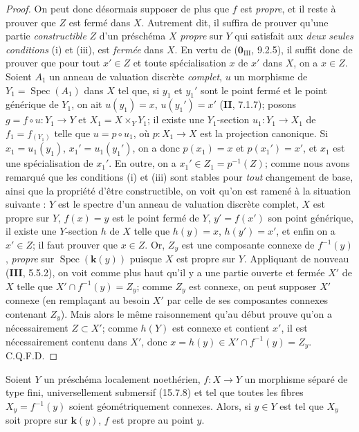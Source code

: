 \begin{proof}
On peut donc désormais supposer de plus que $f$ est \emph{propre}, et il reste à prouver que $Z$ est fermé dans $X$. Autrement dit, il suffira de prouver qu'une partie \emph{constructible} $Z$ d'un préschéma $X$ \emph{propre} sur $Y$ qui satisfait aux \emph{deux seules conditions} (i) et (iii), est \emph{fermée} dans $X$. En vertu de ($\mathbf{0}_{\mathrm{III}}$, 9.2.5), il suffit donc de prouver que pour tout $x'\in Z$ et toute spécialisation $x$ de $x'$ dans $X$, on a $x\in Z$. Soient $A_1$ un anneau de valuation discrète \emph{complet}, $u$ un morphisme de $Y_1=\operatorname{Spec}(A_1)$ dans $X$ tel que, si $y_1$ et $y_1'$ sont le point fermé et le point générique de $Y_1$, on ait $u(y_1)=x$, $u(y_1')=x'$ (\textbf{II}, 7.1.7); posons $g=f\circ u:Y_1\to Y$ et $X_1=X\times_Y Y_1$; il existe une $Y_1$-section $u_1:Y_1\to X_1$ de $f_1=f_{(Y_1)}$ telle que $u=p\circ u_1$, où $p:X_1\to X$ est la projection canonique. Si $x_1=u_1(y_1)$, $x_1'=u_1(y_1')$, on a donc $p(x_1)=x$ et $p(x_1')=x'$, et $x_1$ est une spécialisation de $x_1'$. En outre, on a $x_1'\in Z_1=p^{-1}(Z)$; comme nous avons remarqué que les conditions (i) et (iii) sont stables pour \emph{tout} changement de base, ainsi que la propriété d'être constructible, on voit qu'on est ramené à la situation suivante : $Y$ est le spectre d'un anneau de valuation discrète complet, $X$ est propre sur $Y$, $f(x)=y$ est le point fermé de $Y$, $y'=f(x')$ son point générique, il existe une $Y$-section $h$ de $X$ telle que $h(y)=x$, $h(y')=x'$, et enfin on a $x'\in Z$; il faut prouver que $x\in Z$. Or, $Z_y$ est une composante connexe de $f^{-1}(y)$, \emph{propre} sur $\operatorname{Spec}(\mathbf k(y))$ puisque $X$ est propre sur $Y$. Appliquant de nouveau (\textbf{III}, 5.5.2), on voit comme plus haut qu'il y a une partie ouverte et fermée $X'$ de $X$ telle que $X'\cap f^{-1}(y)=Z_y$; comme $Z_y$ est connexe,
on peut supposer $X'$ connexe (en remplaçant au besoin $X'$ par celle de ses composantes connexes contenant $Z_y$). Mais alors le même raisonnement qu'au début prouve qu'on a nécessairement $Z\subset X'$; comme $h(Y)$ est connexe et contient $x'$, il est nécessairement contenu dans $X'$, donc $x=h(y)\in X'\cap f^{-1}(y)=Z_y$. C.Q.F.D.
\end{proof}

\begin{corollary}[15.7.10]
\label{IV.15.7.10-fr}
Soient $Y$ un préschéma localement noethérien, $f:X\to Y$ un morphisme séparé de type fini, universellement submersif (15.7.8) et tel que toutes les fibres $X_y=f^{-1}(y)$ soient géométriquement connexes. Alors, si $y\in Y$ est tel que $X_y$ soit propre sur $\mathbf k(y)$, $f$ est propre au point $y$.
\end{corollary}

